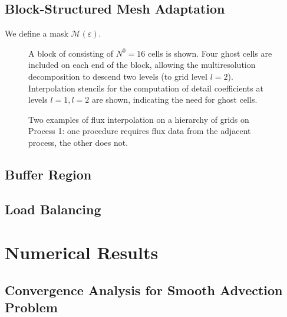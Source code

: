 \documentclass[12pt,letterpaper]{article}
\begin{document}
    \subsection*{Block-Structured Mesh Adaptation}
    We define a mask $\bm{\mathcal{M}}(\varepsilon)$.

    \begin{figure}[H]
        \center
        
        \caption{A block of consisting of $N^{0} = 16$ cells is shown. Four
        ghost cells are included on each end of the block, allowing the
        multiresolution decomposition to descend two levels (to grid level
        $l=2$). Interpolation stencils for the computation of detail
        coefficients at levels $l=1, l=2$ are shown, indicating the need for ghost cells.}
    \end{figure}
    \begin{figure}[H]
        \center
        
        \caption{}
    \end{figure}


    \begin{figure}[H]
        \center
        
       \caption{Two examples of flux interpolation on a hierarchy of grids
        on Process 1: one procedure requires flux data from the adjacent
        process, the other does not.}
    \end{figure}

    \subsection*{Buffer Region}

    \subsection*{Load Balancing}

\section{Numerical Results}

    \subsection*{Convergence Analysis for Smooth Advection Problem}
\end{document}
